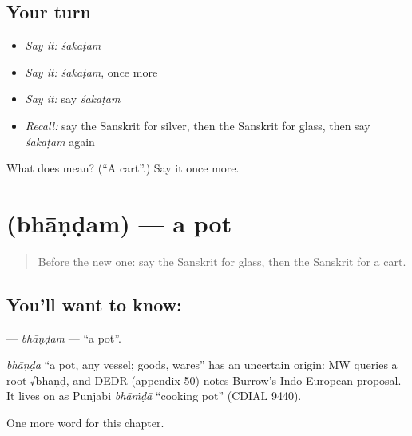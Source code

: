 \subsection*{Your turn}
\begin{itemize}
\raggedright
  \item \emph{Say it:} \emph{śakaṭam}
  \item \emph{Say it:} \emph{śakaṭam}, once more
  \item \emph{Say it:} say \emph{śakaṭam}
  \item \emph{Recall:} say the Sanskrit for silver, then the Sanskrit for glass, then say \emph{śakaṭam} again
\end{itemize}

\begin{tcolorbox}[breakable,colback=teal!4,colframe=teal!35!black,title={Before you move on}]
What does  mean? (\textquotedblleft{}A cart\textquotedblright{}.) Say it once more.
\end{tcolorbox}
\section[\texorpdfstring{\sk{भाण्डम्} (bhāṇḍam)}{भाण्डम् (bhāṇḍam)}]{ (bhāṇḍam) — a pot}

\label{lesson:SA-C122-bhandam}



\begin{quote}
Before the new one: say the Sanskrit for glass, then the Sanskrit for a cart.
\end{quote}

\subsection*{You'll want to know: }
\textbf{} — \emph{bhāṇḍam} — \textquotedblleft{}a pot\textquotedblright{}.

\begin{cousinweb}
\emph{bhāṇḍa} \textquotedblleft{}a pot, any vessel; goods, wares\textquotedblright{} has an uncertain origin: MW queries a root √bhaṇḍ, and DEDR (appendix 50) notes Burrow's Indo-European proposal. It lives on as Punjabi \emph{bhāṁḍā} \textquotedblleft{}cooking pot\textquotedblright{} (CDIAL 9440).
\end{cousinweb}

\begin{grammarlens}[title={What you've built}]
One more word for this chapter.
\end{grammarlens}

